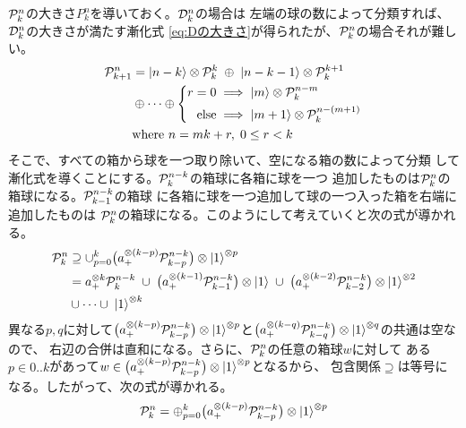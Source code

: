 	${\mathcal{P}}_k^n$の大きさ$P_k^n$を導いておく。${\mathcal{D}}_k^n$の場合は
	左端の球の数によって分類すれば、${\mathcal{D}}_k^n$の大きさが満たす漸化式
	\eqref{eq:Dの大きさ}が得られたが、${\mathcal{P}}_k^n$の場合それが難しい。
	\begin{equation*}\begin{split} %
		\bunkatu_{k+1}^n &= \ket{n-k}\otimes\bunkatu_{k}^k
		\;\oplus\; \ket{n-k-1}\otimes\bunkatu_{k}^{k+1} \\
		&\oplus\cdots\oplus \left\{\begin{split}
			r=0 &\implies \ket{m}\otimes\bunkatu_{k}^{n-m} \\
			\text{else} &\implies \ket{m+1}\otimes\bunkatu_{k}^{n-(m+1)} \\
		\end{split}\right. \\ %
		&\text{where } n=mk+r,\;0\le r< k
	\end{split}\end{equation*} %
	そこで、すべての箱から球を一つ取り除いて、空になる箱の数によって分類
	して漸化式を導くことにする。${\mathcal{P}}_k^{n-k}$の箱球に各箱に球を一つ
	追加したものは${\mathcal{P}}_k^n$の箱球になる。${\mathcal{P}}_{k-1}^{n-k}$の箱球
	に各箱に球を一つ追加して球の一つ入った箱を右端に追加したものは
	${\mathcal{P}}_k^n$の箱球になる。このようにして考えていくと次の式が導かれる。
	\begin{equation*}\begin{split} %
		\bunkatu_k^n &\supseteq 
		\cup_{p=0}^k \bigl(a_+^{\otimes(k-p)}\bunkatu_{k-p}^{n-k}\bigr)
			\otimes\ket{1}^{\otimes p} \\
		&= a_+^{\otimes k}\bunkatu_k^{n-k}
		\;\cup\; \bigl(a_+^{\otimes (k-1)}\bunkatu_{k-1}^{n-k}\bigr)
			\otimes\ket{1}
		\;\cup\; \bigl(a_+^{\otimes (k-2)}\bunkatu_{k-2}^{n-k}\bigr)
			\otimes\ket{1}^{\otimes 2} \\
		&\cup \cdots \cup\; \ket{1}^{\otimes k} \\
	\end{split}\end{equation*} %
	異なる$p,q$に対して$\bigl(a_+^{\otimes(k-p)}{\mathcal{P}}_{k-p}^{n-k}\bigr)
	\otimes\mathinner{|{1}\rangle}^{\otimes p}$と$\bigl(a_+^{\otimes(k-q)}
	{\mathcal{P}}_{k-q}^{n-k}\bigr)\otimes\mathinner{|{1}\rangle}^{\otimes q}$の共通は空なので、
	右辺の合併は直和になる。さらに、${\mathcal{P}}_k^n$の任意の箱球$w$に対して
	ある$p\in0..k$があって$w\in\bigl(a_+^{\otimes(k-p)}
	{\mathcal{P}}_{k-p}^{n-k}\bigr)\otimes\mathinner{|{1}\rangle}^{\otimes p}$となるから、
	包含関係$\supseteq$は等号になる。したがって、次の式が導かれる。
	\begin{equation*}\begin{split} %
		\bunkatu_k^n = \oplus_{p=0}^k
			\bigl(a_+^{\otimes(k-p)}\bunkatu_{k-p}^{n-k}\bigr)
			\otimes\ket{1}^{\otimes p}
	\end{split}\end{equation*} %
